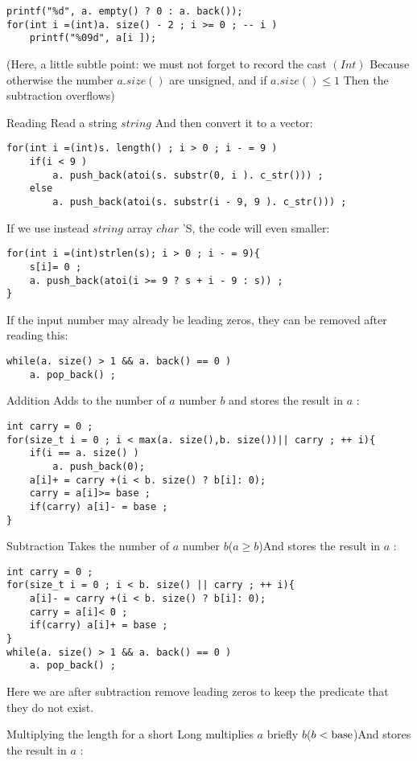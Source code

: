 \begin{verbatim}
printf("%d", a. empty() ? 0 : a. back());
for(int i =(int)a. size() - 2 ; i >= 0 ; -- i )
    printf("%09d", a[i ]); 
\end{verbatim}
(Here, a little subtle point: we must not forget to record the cast $(Int)$ Because otherwise the number $a.size()$ are unsigned, and if $a.size() \le 1$ Then the subtraction overflows)

Reading
Read a string $string$ And then convert it to a vector:

\begin{verbatim}
for(int i =(int)s. length() ; i > 0 ; i - = 9 )
    if(i < 9 )
        a. push_back(atoi(s. substr(0, i ). c_str())) ;
    else
        a. push_back(atoi(s. substr(i - 9, 9 ). c_str())) ; 
\end{verbatim}
If we use instead $string$ array $char$ 'S, the code will even smaller:

\begin{verbatim}
for(int i =(int)strlen(s); i > 0 ; i - = 9){
    s[i]= 0 ;
    a. push_back(atoi(i >= 9 ? s + i - 9 : s)) ;
} 
\end{verbatim}
If the input number may already be leading zeros, they can be removed after reading this:

\begin{verbatim}
while(a. size() > 1 && a. back() == 0 )
    a. pop_back() ; 
\end{verbatim}
Addition
Adds to the number of $a$ number $b$ and stores the result in $a$ :

\begin{verbatim}
int carry = 0 ;
for(size_t i = 0 ; i < max(a. size(),b. size())|| carry ; ++ i){
    if(i == a. size() )
        a. push_back(0);
    a[i]+ = carry +(i < b. size() ? b[i]: 0);
    carry = a[i]>= base ;
    if(carry) a[i]- = base ;
} 
\end{verbatim}
Subtraction
Takes the number of $a$ number $b$($a \ge b$)And stores the result in $a$ :

\begin{verbatim}
int carry = 0 ;
for(size_t i = 0 ; i < b. size() || carry ; ++ i){
    a[i]- = carry +(i < b. size() ? b[i]: 0);
    carry = a[i]< 0 ;
    if(carry) a[i]+ = base ;
}
while(a. size() > 1 && a. back() == 0 )
    a. pop_back() ; 
\end{verbatim}
Here we are after subtraction remove leading zeros to keep the predicate that they do not exist.

Multiplying the length for a short
Long multiplies $a$ briefly $b$($b <{\rm base}$)And stores the result in $a$ :

